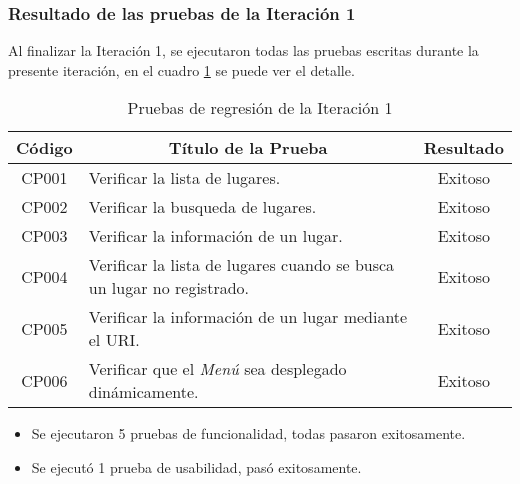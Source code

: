 \subsubsection{Resultado de las pruebas de la Iteración 1}

Al finalizar la Iteración 1, se ejecutaron todas las pruebas escritas durante la presente iteración, en el cuadro \ref{tab:regresion_1} se puede ver el detalle.


\begin{table}[H]
  \begin{center}
    \begin{tabularx}{0.8\textwidth}{ c  X  c }
      \toprule
        \textbf{Código} &
        \multicolumn{1}{c}{\textbf{Título de la Prueba}} &
        \textbf{Resultado}\\

      \midrule
        CP001
        &
        Verificar la lista de lugares.
        &
        Exitoso \\

\addlinespace
CP002
&
Verificar la busqueda de lugares.
&
Exitoso \\

\addlinespace
CP003
&
Verificar la información de un lugar.
&
Exitoso \\

\addlinespace
CP004
&
Verificar la lista de lugares cuando se busca un lugar no registrado.
&
Exitoso \\

\addlinespace
CP005
&
Verificar la información de un lugar mediante el URI.
&
Exitoso \\

\addlinespace
CP006
&
Verificar que el \emph{Menú} sea desplegado dinámicamente.
&
Exitoso \\



      \bottomrule
    \end{tabularx}
    \caption{Pruebas de regresión de la Iteración 1}
    \label{tab:regresion_1}
  \end{center}
\end{table}


\begin{itemize}
  \item Se ejecutaron 5 pruebas de funcionalidad, todas pasaron exitosamente.
  \item Se ejecutó 1 prueba de usabilidad, pasó exitosamente.
\end{itemize}
